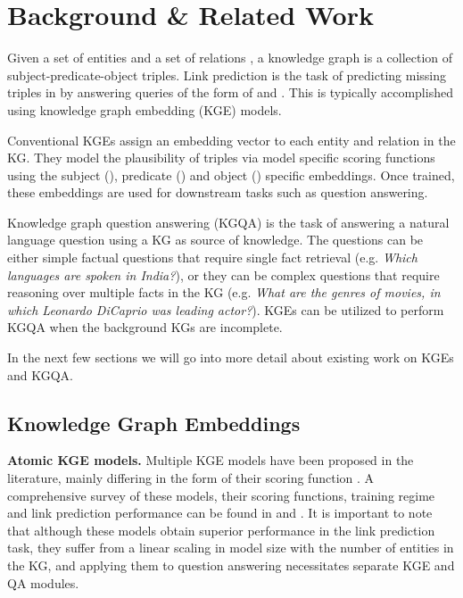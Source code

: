\documentclass[11pt]{article}
\renewcommand\:{\colon} \newcommand{\sset}[1]{\left\{\,#1\,\right\}} \newcommand{\ssets}[1]{\left\{#1\right\}} \newcommand{\ssetn}[1]{\{\,#1\,\}}
\begin{document}
\section{Background \& Related Work}
\label{sec:related_work}
Given a set of entities  and a set of relations , a knowledge graph  is a collection of subject-predicate-object  triples.
Link prediction is the task of predicting missing triples in  by answering queries of the form of  and . This is typically accomplished using knowledge graph embedding (KGE) models.

Conventional KGEs assign an embedding vector to each entity and relation in the KG. They model the plausibility of  triples via model specific scoring functions  using the subject (), predicate () and object () specific embeddings.
Once trained, these embeddings are used for downstream tasks such as question answering.




Knowledge graph question answering (KGQA) is the task of answering a natural language question using a KG as source of knowledge. 
The questions can be either simple factual questions that require single fact retrieval 
(e.g. \textit{Which languages are spoken in India?}), 
or they can be complex questions that require reasoning over multiple facts in the KG 
(e.g. \textit{What are the genres of movies, in which Leonardo DiCaprio was leading actor?}).
KGEs can be utilized to perform KGQA when the background KGs are incomplete.


In the next few sections we will go into more detail about existing work on KGEs and KGQA.

\subsection{Knowledge Graph Embeddings}
\label{sec:kge}

\textbf{Atomic KGE models.} 
Multiple KGE models have been proposed in the literature, mainly differing in the form of their scoring function . A comprehensive survey of these models, their scoring functions, training regime and link prediction performance can be found in \citet{kge_survey} and \citet{ruffinelli2020you}.
It is important to note that although these models obtain superior performance in the link prediction task, they suffer from a linear scaling in model size with the number of entities in the KG, and applying them to question answering necessitates separate KGE and QA modules.
\end{document}
